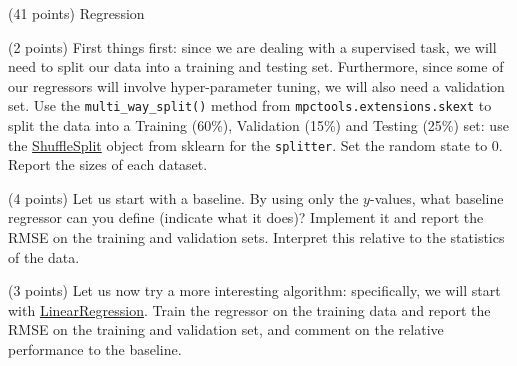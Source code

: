\documentclass[12pt]{article}
\begin{document}


\begin{question}{\label{Q_LR_BA}(41 points) Regression}





\begin{subquestion}{(2 points) First things first: since we are dealing with a supervised task, we will need to split our data into a training and testing set. Furthermore, since some of our regressors will involve hyper-parameter tuning, we will also need a validation set. Use the \texttt{multi\_way\_split()} method from \texttt{mpctools.extensions.skext} to split the data into a Training (60\%), Validation (15\%) and Testing (25\%) set: use the \href{https://scikit-learn.org/stable/modules/generated/sklearn.model_selection.ShuffleSplit.html}{ShuffleSplit} object from sklearn for the \texttt{splitter}. Set the random state to 0.  Report the sizes of each dataset.}






\end{subquestion}

\begin{subquestion}{(4 points) Let us start with a baseline. By using only the $y$-values, what baseline regressor can you define (indicate what it does)? Implement it and report the RMSE on the training and validation sets. Interpret this relative to the statistics of the data.}






\end{subquestion}

\begin{subquestion}{(3 points) Let us now try a more interesting algorithm: specifically, we will start with \href{https://scikit-learn.org/stable/modules/generated/sklearn.linear_model.LinearRegression.html}{LinearRegression}. Train the regressor on the training data and report the RMSE on the training and validation set, and comment on the relative performance to the baseline.}




\end{subquestion}
\end{question}
\end{document}
